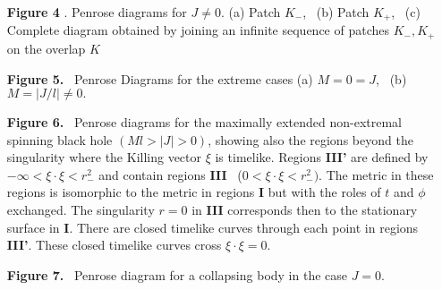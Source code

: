 \bigskip
\noindent
\begin{enumerate}
\item[{\bf Figure 4}]. Penrose diagrams for $J \not= 0$.
(a) Patch $K_-$, \ (b)
 Patch $K_+$, \ (c) Complete diagram obtained by joining an infinite
sequence of
 patches $K_-, K_+$ on the overlap $K$
\noindent
\item[{\bf Figure 5.}] \ Penrose Diagrams for the extreme cases (a)
$M=0=J$, \
 (b) $M= \vert J/l \vert \not= 0.$
\item[{\bf Figure 6.}] \ Penrose diagrams for the maximally extended
 non-extremal spinning black hole $(Ml > \vert J \vert > 0)$, showing also the
 regions beyond the singularity where the Killing vector $\xi$ is timelike.
 Regions {\bf III'} are defined by $- \infty < \xi \cdot \xi < r^2_-$ and
 contain regions {\bf III} \  ($0 < \xi \cdot \xi < r^2_-)$. The metric in
these
 regions is isomorphic to the metric in regions {\bf I} but with the roles of
 $t$ and $\phi$ exchanged. The singularity $r=0$ in {\bf III} corresponds then
 to the stationary surface in {\bf I}. There are closed timelike curves
through
each point in regions {\bf III'}. These closed timelike curves
cross $\xi\cdot\xi=0$.
\item[{\bf Figure 7.}]\ Penrose diagram for a collapsing body in the case
$J=0$.
\end{enumerate}

